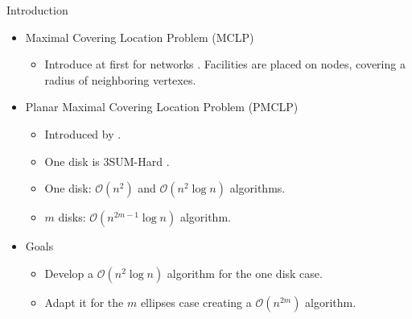 \documentclass{beamer}
\newcommand{\R}{\mathbb{R}}
\newcommand{\bigO}{\mathscr{O}}
\begin{document}
\begin{frame}{Introduction}
\begin{itemize}

	\item Maximal Covering Location Problem (MCLP)
	
	\begin{itemize}
		\item Introduce at first for networks \autocite{church:1974}. Facilities are placed on nodes, covering a radius of neighboring vertexes.
	\end{itemize}
	\item Planar Maximal Covering Location Problem (PMCLP)
	\begin{itemize}
		\item Introduced by \autocite{church:1984}.
		\item One disk is 3SUM-Hard \autocite{3SUM-kopelowitz:2014}.
		\item One disk: $\bigO(n^2)$ and $\bigO(n^2\log{n})$ algorithms.
		\item $m$ disks: $\bigO(n^{2m-1}\log{n})$ algorithm.
	\end{itemize}
	\item Goals
	\begin{itemize}
		\item Develop a $\bigO(n^2\log{n})$ algorithm for the one disk case.
		\item Adapt it for the $m$ ellipses case creating a $\bigO(n^{2m})$ algorithm.
	\end{itemize}
\end{itemize}

\end{frame} 





	
%			
\end{document}
